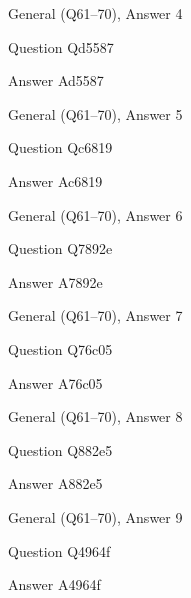 \documentclass[11pt]{beamer}
\begin{document}
\begin{frame}[t]{General (Q61--70), Answer 4}
\vspace{2em}
\begin{block}{Question}
Qd5587
\end{block}
\pause{}
\begin{block}{Answer}
Ad5587
\end{block}
\end{frame}
    

\begin{frame}[t]{General (Q61--70), Answer 5}
\vspace{2em}
\begin{block}{Question}
Qc6819
\end{block}
\pause{}
\begin{block}{Answer}
Ac6819
\end{block}
\end{frame}
    

\begin{frame}[t]{General (Q61--70), Answer 6}
\vspace{2em}
\begin{block}{Question}
Q7892e
\end{block}
\pause{}
\begin{block}{Answer}
A7892e
\end{block}
\end{frame}
    

\begin{frame}[t]{General (Q61--70), Answer 7}
\vspace{2em}
\begin{block}{Question}
Q76c05
\end{block}
\pause{}
\begin{block}{Answer}
A76c05
\end{block}
\end{frame}
    

\begin{frame}[t]{General (Q61--70), Answer 8}
\vspace{2em}
\begin{block}{Question}
Q882e5
\end{block}
\pause{}
\begin{block}{Answer}
A882e5
\end{block}
\end{frame}
    

\begin{frame}[t]{General (Q61--70), Answer 9}
\vspace{2em}
\begin{block}{Question}
Q4964f
\end{block}
\pause{}
\begin{block}{Answer}
A4964f
\end{block}
\end{frame}
    
\end{document}
